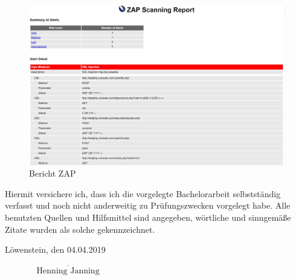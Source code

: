 \documentclass[12pt,oneside,a4paper,parskip,pointlessnumbers]{scrbook}
\def\BaAuthor{Henning Janning}
\def\BaDeadline{04.04.2019}
\begin{document}
  \begin{figure}[htb!]
    \centering
      \includegraphics[width=1.01\textwidth]{Images/ScrZAP}
    \caption[Bericht ZAP]{Bericht ZAP}
  \end{figure}


\backmatter


Hiermit versichere ich, dass ich die vorgelegte Bachelorarbeit selbstständig verfasst und noch nicht anderweitig zu Prüfungszwecken vorgelegt habe. Alle benutzten Quellen und Hilfsmittel sind angegeben, wörtliche und sinngemäße Zitate wurden als solche gekennzeichnet.

\vspace{20pt}
Löwenstein, den \BaDeadline
\begin{flushright}
$\overline{~~~~~~~~~~~~~~~~~\mbox{\BaAuthor}~~~~~~~~~~~~~~~~~}$
\end{flushright}
\end{document}
